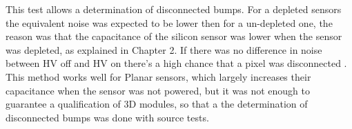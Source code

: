 This test allows a determination of disconnected bumps. For a depleted sensors the equivalent noise was expected to be lower then for a un-depleted one, the reason was that the capacitance of the silicon sensor was lower when the sensor was depleted, as explained in Chapter 2. If there was no difference in noise between HV off and HV on there's a high chance that a pixel was disconnected \cite{IBL-module-qualification}. This method works well for Planar  sensors, which largely increases their capacitance when the sensor was not powered, but it was not enough to guarantee a qualification of 3D modules, so that a the determination of disconnected bumps was done with source tests.



